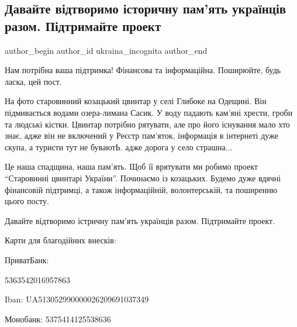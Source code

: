  
 
 
 
 
 
\subsection{Давайте відтворимо історичну пам'ять українців разом. Підтримайте проект}
\label{sec:28_01_2022.fb.ukraina_incognita.1.proekt_istorychna_pamjat}
 
\ifcmt
 author_begin
   author_id ukraina_incognita
 author_end
\fi

Нам потрібна ваша підтримка! Фінансова та інформаційна. Поширюйте, будь ласка,
цей пост.

На фото  старовинний козацький цвинтар у селі Глибоке на Одещині. Він
підмивається водами озера-лимана Сасик. У воду падають кам'яні хрести, гроби та
людські кістки. Цвинтар потрібно рятувати, але про його існування мало хто
знає, адже він не включений у Реєстр пам'яток, інформація в інтернеті дуже
скупа, а туристи тут не буваютЬ. адже дорога у село страшна... 


Це наша спадщина, наша пам'ять. Щоб її врятувати ми робимо проект  \enquote{Старовинні
цвинтарі України}. Починаємо із козацьких. Будемо дуже вдячні фінансовій
підтримці, а також інформаційній, волонтерській, та поширенню цього посту.


Давайте відтворимо істричну пам’ять українців разом. Підтримайте проект.

Карти для благодійних внесків:

ПриватБанк:

5363542016957863

Iban:
UA513052990000026209691037349

Монобанк:
5375414125538636

